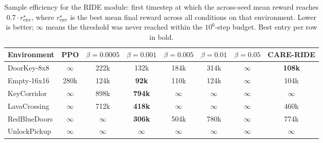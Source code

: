 \begin{table}[H]
\centering
\caption[Sample efficiency for the RIDE module.]{Sample efficiency for the RIDE module: first timestep at which the across-seed mean reward reaches $0.7 \cdot r^\star_\text{env}$, where $r^\star_\text{env}$ is the best mean final reward across all conditions on that environment. Lower is better; $\infty$ means the threshold was never reached within the $10^6$-step budget. Best entry per row in bold.}
\label{tab:sample_efficiency_ride}
\small
\setlength{\tabcolsep}{4pt}
\begin{tabular}{|l|c|c|c|c|c|c|c|}
\hline
\textbf{Environment} & \textbf{PPO} & \textbf{$\beta{=}0.0005$} & \textbf{$\beta{=}0.001$} & \textbf{$\beta{=}0.005$} & \textbf{$\beta{=}0.01$} & \textbf{$\beta{=}0.05$} & \textbf{CARE-RIDE} \\
\hline
DoorKey-8x8 & $\infty$ & 222k & 132k & 184k & 314k & $\infty$ & \textbf{108k} \\
\hline
Empty-16x16 & 280k & 124k & \textbf{92k} & 110k & 124k & $\infty$ & 104k \\
\hline
KeyCorridor & $\infty$ & 898k & \textbf{794k} & $\infty$ & $\infty$ & $\infty$ & $\infty$ \\
\hline
LavaCrossing & $\infty$ & 712k & \textbf{418k} & $\infty$ & $\infty$ & $\infty$ & 460k \\
\hline
RedBlueDoors & $\infty$ & $\infty$ & \textbf{306k} & 504k & 780k & $\infty$ & 774k \\
\hline
UnlockPickup & $\infty$ & $\infty$ & $\infty$ & $\infty$ & $\infty$ & $\infty$ & $\infty$ \\
\hline
\end{tabular}
\end{table}